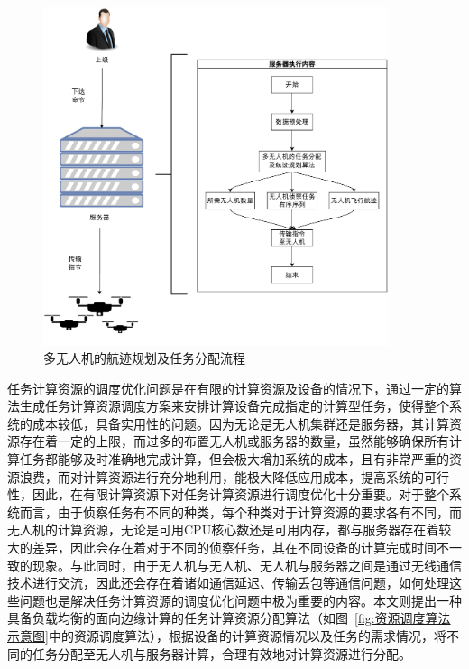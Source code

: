 \begin{figure}[!htbp]
    \centering
    \includegraphics[width=0.9\textwidth]{images/多无人机的任务分配及航迹规划流程.pdf}
    \caption{多无人机的航迹规划及任务分配流程}
    \label{fig:多无人机的航迹规划及任务分配流程}
\end{figure}

任务计算资源的调度优化问题是在有限的计算资源及设备的情况下，通过一定的算法生成任务计算资源调度方案来安排计算设备完成指定的计算型任务，使得整个系统的成本较低，具备实用性的问题。因为无论是无人机集群还是服务器，其计算资源存在着一定的上限，而过多的布置无人机或服务器的数量，虽然能够确保所有计算任务都能够及时准确地完成计算，但会极大增加系统的成本，且有非常严重的资源浪费，而对计算资源进行充分地利用，能极大降低应用成本，提高系统的可行性，因此，在有限计算资源下对任务计算资源进行调度优化十分重要。对于整个系统而言，由于侦察任务有不同的种类，每个种类对于计算资源的要求各有不同，而无人机的计算资源，无论是可用CPU核心数还是可用内存，都与服务器存在着较大的差异，因此会存在着对于不同的侦察任务，其在不同设备的计算完成时间不一致的现象。与此同时，由于无人机与无人机、无人机与服务器之间是通过无线通信技术进行交流，因此还会存在着诸如通信延迟、传输丢包等通信问题，如何处理这些问题也是解决任务计算资源的调度优化问题中极为重要的内容。本文则提出一种具备负载均衡的面向边缘计算的任务计算资源分配算法（如图~\ref{fig:资源调度算法示意图}中的资源调度算法），根据设备的计算资源情况以及任务的需求情况，将不同的任务分配至无人机与服务器计算，合理有效地对计算资源进行分配。

